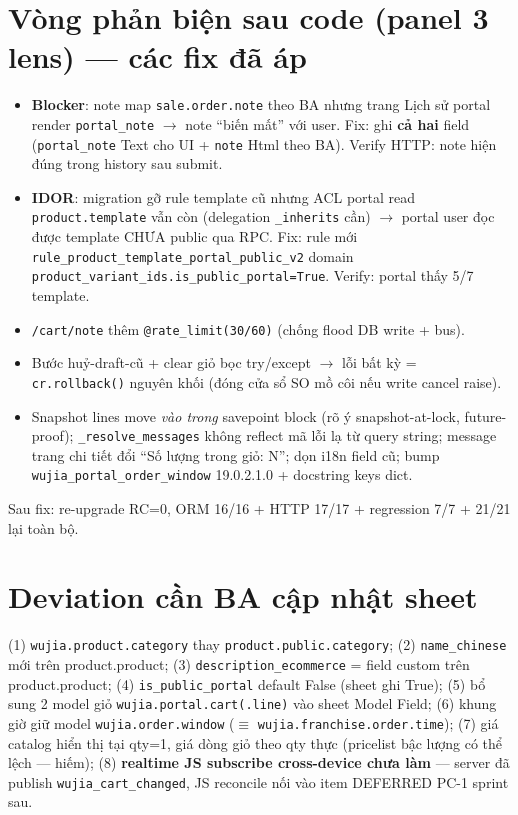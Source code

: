 \section{Vòng phản biện sau code (panel 3 lens) --- các fix đã áp}

\begin{itemize}
\item \textbf{Blocker}: note map \texttt{sale.order.note} theo BA nhưng trang Lịch sử portal
      render \texttt{portal\_note} $\rightarrow$ note ``biến mất'' với user. Fix: ghi \textbf{cả
      hai} field (\texttt{portal\_note} Text cho UI + \texttt{note} Html theo BA). Verify HTTP:
      note hiện đúng trong history sau submit.
\item \textbf{IDOR}: migration gỡ rule template cũ nhưng ACL portal read
      \texttt{product.template} vẫn còn (delegation \texttt{\_inherits} cần) $\rightarrow$ portal
      user đọc được template CHƯA public qua RPC. Fix: rule mới
      \texttt{rule\_product\_template\_portal\_public\_v2} domain
      \texttt{product\_variant\_ids.is\_public\_portal=True}. Verify: portal thấy 5/7 template.
\item \texttt{/cart/note} thêm \texttt{@rate\_limit(30/60)} (chống flood DB write + bus).
\item Bước huỷ-draft-cũ + clear giỏ bọc try/except $\rightarrow$ lỗi bất kỳ =
      \texttt{cr.rollback()} nguyên khối (đóng cửa sổ SO mồ côi nếu write cancel raise).
\item Snapshot lines move \emph{vào trong} savepoint block (rõ ý snapshot-at-lock,
      future-proof); \texttt{\_resolve\_messages} không reflect mã lỗi lạ từ query string;
      message trang chi tiết đổi ``Số lượng trong giỏ: N''; dọn i18n field cũ; bump
      \texttt{wujia\_portal\_order\_window} 19.0.2.1.0 + docstring keys dict.
\end{itemize}

Sau fix: re-upgrade RC=0, ORM 16/16 + HTTP 17/17 + regression 7/7 + 21/21 lại toàn bộ.

\section{Deviation cần BA cập nhật sheet}

(1) \texttt{wujia.product.category} thay \texttt{product.public.category};
(2) \texttt{name\_chinese} mới trên product.product;
(3) \texttt{description\_ecommerce} = field custom trên product.product;
(4) \texttt{is\_public\_portal} default False (sheet ghi True);
(5) bổ sung 2 model giỏ \texttt{wujia.portal.cart(.line)} vào sheet Model Field;
(6) khung giờ giữ model \texttt{wujia.order.window} ($\equiv$ \texttt{wujia.franchise.order.time});
(7) giá catalog hiển thị tại qty=1, giá dòng giỏ theo qty thực (pricelist bậc lượng có thể lệch --- hiếm);
(8) \textbf{realtime JS subscribe cross-device chưa làm} --- server đã publish
\texttt{wujia\_cart\_changed}, JS reconcile nối vào item DEFERRED PC-1 sprint sau.


